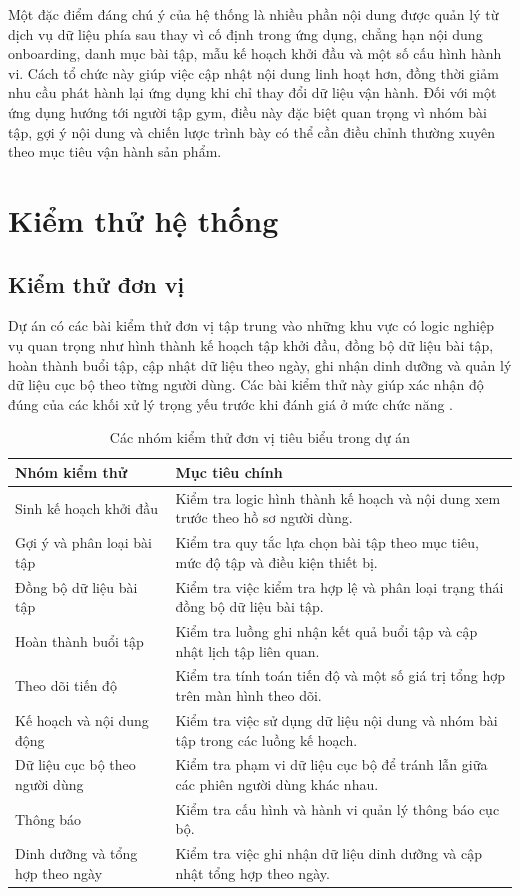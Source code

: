 Một đặc điểm đáng chú ý của hệ thống là nhiều phần nội dung được quản lý từ dịch vụ dữ liệu phía sau thay vì cố định trong ứng dụng, chẳng hạn nội dung onboarding, danh mục bài tập, mẫu kế hoạch khởi đầu và một số cấu hình hành vi. Cách tổ chức này giúp việc cập nhật nội dung linh hoạt hơn, đồng thời giảm nhu cầu phát hành lại ứng dụng khi chỉ thay đổi dữ liệu vận hành. Đối với một ứng dụng hướng tới người tập gym, điều này đặc biệt quan trọng vì nhóm bài tập, gợi ý nội dung và chiến lược trình bày có thể cần điều chỉnh thường xuyên theo mục tiêu vận hành sản phẩm.

\section{Kiểm thử hệ thống}

\subsection{Kiểm thử đơn vị}

Dự án có các bài kiểm thử đơn vị tập trung vào những khu vực có logic nghiệp vụ quan trọng như hình thành kế hoạch tập khởi đầu, đồng bộ dữ liệu bài tập, hoàn thành buổi tập, cập nhật dữ liệu theo ngày, ghi nhận dinh dưỡng và quản lý dữ liệu cục bộ theo từng người dùng. Các bài kiểm thử này giúp xác nhận độ đúng của các khối xử lý trọng yếu trước khi đánh giá ở mức chức năng \cite{android_jetpack,android_room}.

\begin{table}[H]
\centering
\small
\caption{Các nhóm kiểm thử đơn vị tiêu biểu trong dự án}
\label{tab:unit-tests}
\begin{tabular}{|p{4.7cm}|p{7.4cm}|}
\hline
\textbf{Nhóm kiểm thử} & \textbf{Mục tiêu chính} \\ \hline
Sinh kế hoạch khởi đầu & Kiểm tra logic hình thành kế hoạch và nội dung xem trước theo hồ sơ người dùng. \\ \hline
Gợi ý và phân loại bài tập & Kiểm tra quy tắc lựa chọn bài tập theo mục tiêu, mức độ tập và điều kiện thiết bị. \\ \hline
Đồng bộ dữ liệu bài tập & Kiểm tra việc kiểm tra hợp lệ và phân loại trạng thái đồng bộ dữ liệu bài tập. \\ \hline
Hoàn thành buổi tập & Kiểm tra luồng ghi nhận kết quả buổi tập và cập nhật lịch tập liên quan. \\ \hline
Theo dõi tiến độ & Kiểm tra tính toán tiến độ và một số giá trị tổng hợp trên màn hình theo dõi. \\ \hline
Kế hoạch và nội dung động & Kiểm tra việc sử dụng dữ liệu nội dung và nhóm bài tập trong các luồng kế hoạch. \\ \hline
Dữ liệu cục bộ theo người dùng & Kiểm tra phạm vi dữ liệu cục bộ để tránh lẫn giữa các phiên người dùng khác nhau. \\ \hline
Thông báo & Kiểm tra cấu hình và hành vi quản lý thông báo cục bộ. \\ \hline
Dinh dưỡng và tổng hợp theo ngày & Kiểm tra việc ghi nhận dữ liệu dinh dưỡng và cập nhật tổng hợp theo ngày. \\ \hline
\end{tabular}
\normalsize
\end{table}

